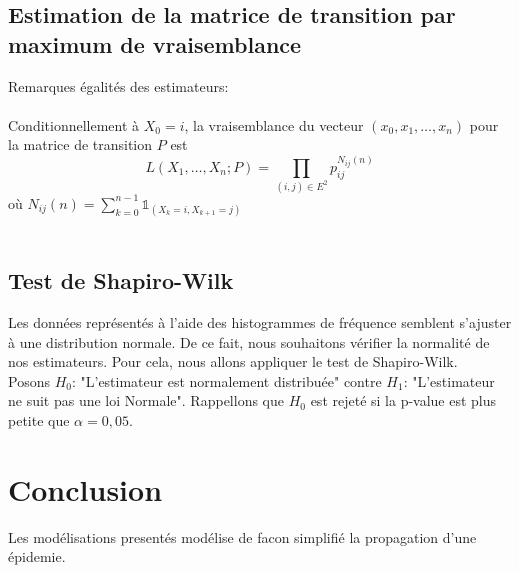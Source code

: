 \documentclass[12pt,a4paper]{report}
\theoremstyle{remark}
\begin{document}
\subsection{Estimation de la matrice de transition par maximum de vraisemblance}

Remarques égalités des estimateurs:
\\
\\
Conditionnellement à $X_{0}=i$, la vraisemblance du vecteur $\left(x_{0}, x_{1}, \ldots, x_{n}\right)$ pour la matrice de transition $P$ est
$$L\left(X_{1}, \ldots, X_{n} ; P\right)=\prod_{(i, j) \in E^{2}} p_{i j}^{N_{i j}(n)}$$
où $N_{i j}(n)=\sum_{k=0}^{n-1} \mathbb{1}_{\left(X_{k}=i, X_{k+1}=j\right)}$
\\
\\

\subsection{Test de Shapiro-Wilk}

Les données représentés à l'aide des histogrammes de fréquence semblent s'ajuster à une distribution normale.
De ce fait, nous souhaitons vérifier la normalité de nos estimateurs.
Pour cela, nous allons appliquer le  test de Shapiro-Wilk.
\\
Posons $H_0$: "L'estimateur est normalement distribuée" contre $H_1$: "L'estimateur ne suit pas une loi Normale". Rappellons que $H_0$ est rejeté si la p-value est plus petite que $\alpha=0,05$. 





\newpage
\section*{Conclusion}
Les modélisations presentés modélise de facon simplifié la propagation d'une épidemie. 
\end{document}
